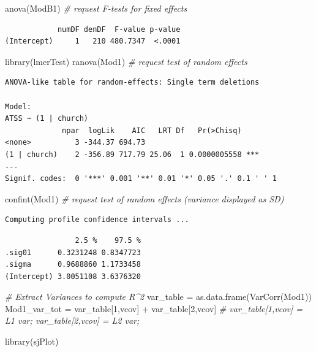 \documentclass[
  english,
]{book}
\newenvironment{Shaded}{\begin{snugshade}}{\end{snugshade}}
\newcommand{\CommentTok}[1]{\textcolor[rgb]{0.56,0.35,0.01}{\textit{#1}}}
\newcommand{\DecValTok}[1]{\textcolor[rgb]{0.00,0.00,0.81}{#1}}
\newcommand{\FunctionTok}[1]{\textcolor[rgb]{0.00,0.00,0.00}{#1}}
\newcommand{\NormalTok}[1]{#1}
\newcommand{\OtherTok}[1]{\textcolor[rgb]{0.56,0.35,0.01}{#1}}
\newcommand{\SpecialCharTok}[1]{\textcolor[rgb]{0.00,0.00,0.00}{#1}}
\newcommand{\StringTok}[1]{\textcolor[rgb]{0.31,0.60,0.02}{#1}}
\begin{document}
\begin{Shaded}
\begin{Highlighting}[]
\FunctionTok{anova}\NormalTok{(ModB1) }\CommentTok{\# request F{-}tests for fixed effects}
\end{Highlighting}
\end{Shaded}

\begin{verbatim}
            numDF denDF  F-value p-value
(Intercept)     1   210 480.7347  <.0001
\end{verbatim}

\begin{Shaded}
\begin{Highlighting}[]
\FunctionTok{library}\NormalTok{(lmerTest)}
\FunctionTok{ranova}\NormalTok{(Mod1) }\CommentTok{\# request test of random effects}
\end{Highlighting}
\end{Shaded}

\begin{verbatim}
ANOVA-like table for random-effects: Single term deletions

Model:
ATSS ~ (1 | church)
             npar  logLik    AIC   LRT Df   Pr(>Chisq)    
<none>          3 -344.37 694.73                          
(1 | church)    2 -356.89 717.79 25.06  1 0.0000005558 ***
---
Signif. codes:  0 '***' 0.001 '**' 0.01 '*' 0.05 '.' 0.1 ' ' 1
\end{verbatim}

\begin{Shaded}
\begin{Highlighting}[]
\FunctionTok{confint}\NormalTok{(Mod1) }\CommentTok{\# request test of random effects (variance displayed as SD)}
\end{Highlighting}
\end{Shaded}

\begin{verbatim}
Computing profile confidence intervals ...
\end{verbatim}

\begin{verbatim}
                2.5 %    97.5 %
.sig01      0.3231248 0.8347723
.sigma      0.9688860 1.1733458
(Intercept) 3.0051108 3.6376320
\end{verbatim}

\begin{Shaded}
\begin{Highlighting}[]
\CommentTok{\# Extract Variances to compute R\^{}2}
\NormalTok{  var\_table }\OtherTok{=} \FunctionTok{as.data.frame}\NormalTok{(}\FunctionTok{VarCorr}\NormalTok{(Mod1))}
\NormalTok{  Mod1\_var\_tot }\OtherTok{=}\NormalTok{ var\_table[}\DecValTok{1}\NormalTok{,}\StringTok{\textquotesingle{}vcov\textquotesingle{}}\NormalTok{] }\SpecialCharTok{+}\NormalTok{ var\_table[}\DecValTok{2}\NormalTok{,}\StringTok{\textquotesingle{}vcov\textquotesingle{}}\NormalTok{] }\CommentTok{\# var\_table[1,\textquotesingle{}vcov\textquotesingle{}] = L1 var; var\_table[2,\textquotesingle{}vcov\textquotesingle{}] = L2 var;  }

\FunctionTok{library}\NormalTok{(sjPlot)}
\end{Highlighting}
\end{Shaded}
\end{document}
